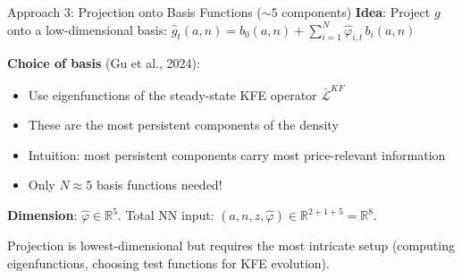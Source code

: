 \documentclass[aspectratio=169,11pt]{beamer}
\newcommand{\emphc}[1]{\textcolor{harvardcrimson}{#1}}
\newcommand{\R}{\mathbb{R}}
\begin{document}
\begin{frame}{Approach 3: Projection onto Basis Functions ($\sim 5$ components)}
\small
\textbf{Idea}: Project $g$ onto a low-dimensional basis:
$\hat{g}_t(a,n) = b_0(a,n) + \sum_{i=1}^{N} \hat{\varphi}_{i,t}\,b_i(a,n)$

\vspace{0.2em}
\textbf{Choice of basis} (Gu et al., 2024):
\begin{itemize}\itemsep0pt
    \item Use \emphc{eigenfunctions} of the steady-state KFE operator $\bar{\mathcal{L}}^{KF}$
    \item These are the \emphc{most persistent} components of the density
    \item Intuition: most persistent components carry most price-relevant information
    \item Only $N \approx 5$ basis functions needed!
\end{itemize}

\vspace{0.1em}
\textbf{Dimension}: $\hat{\varphi} \in \R^5$. Total NN input: $(a, n, z, \hat{\varphi}) \in \R^{2+1+5} = \R^8$.

\vspace{0.1em}
\begin{center}
\colorbox{uzhgreylight}{\parbox{0.7\textwidth}{\centering\footnotesize
Projection is \emphc{lowest-dimensional} but requires the most intricate setup
(computing eigenfunctions, choosing test functions for KFE evolution).}}
\end{center}
\end{frame}
\end{document}
